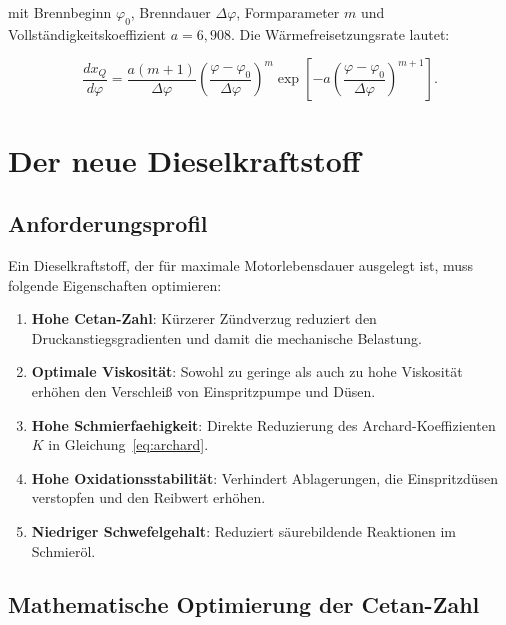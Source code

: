 ﻿\documentclass[12pt,a4paper]{article}
\begin{document}
mit Brennbeginn $\varphi_0$, Brenndauer $\Delta\varphi$, Formparameter $m$
und Vollständigkeitskoeffizient $a = 6{,}908$. Die
Wärmefreisetzungsrate lautet:

\begin{equation}
  \frac{dx_Q}{d\varphi} = \frac{a(m+1)}{\Delta\varphi}
  \left(\frac{\varphi-\varphi_0}{\Delta\varphi}\right)^m
  \exp\!\left[-a\left(\frac{\varphi-\varphi_0}{\Delta\varphi}\right)^{m+1}\right].
  \label{eq:wiebe_dxQ}
\end{equation}

\section{Der neue Dieselkraftstoff}
\label{sec:kraftstoff}

\subsection{Anforderungsprofil}
\label{sec:kraftstoff_anforderungen}

Ein Dieselkraftstoff, der für maximale Motorlebensdauer ausgelegt ist,
muss folgende Eigenschaften optimieren:

\begin{enumerate}[label=(\alph*)]
  \item \textbf{Hohe Cetan-Zahl}: Kürzerer Zündverzug reduziert den
        Druckanstiegsgradienten und damit die mechanische Belastung.
  \item \textbf{Optimale Viskosität}: Sowohl zu geringe als auch zu hohe
        Viskosität erhöhen den Verschlei\ss{} von Einspritzpumpe und Düsen.
  \item \textbf{Hohe Schmierfaehigkeit}: Direkte Reduzierung des
        Archard-Koeffizienten~$K$ in Gleichung~\eqref{eq:archard}.
  \item \textbf{Hohe Oxidationsstabilität}: Verhindert Ablagerungen,
        die Einspritzdüsen verstopfen und den Reibwert erhöhen.
  \item \textbf{Niedriger Schwefelgehalt}: Reduziert säurebildende
        Reaktionen im Schmieröl.
\end{enumerate}

\subsection{Mathematische Optimierung der Cetan-Zahl}
\label{sec:kraftstoff_cetan}
\end{document}
